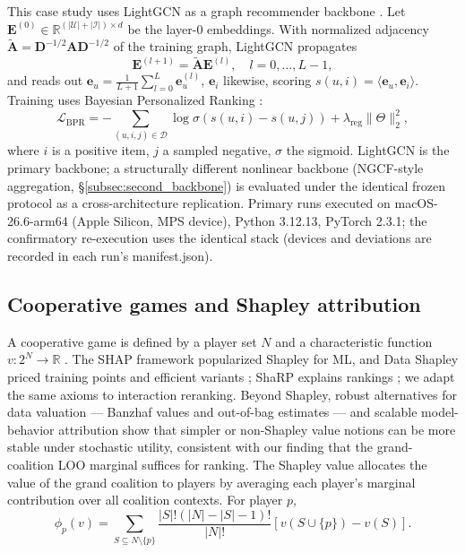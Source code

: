 \documentclass[pdflatex,sn-mathphys-num]{sn-jnl}
\begin{document}
This case study uses LightGCN as a graph recommender backbone \cite{he2020lightgcn}. Let $\mathbf{E}^{(0)}\in\mathbb{R}^{(|\mathcal{U}|+|\mathcal{I}|)\times d}$ be the layer-0 embeddings. With normalized adjacency $\tilde{\mathbf{A}}=\mathbf{D}^{-1/2}\mathbf{A}\mathbf{D}^{-1/2}$ of the training graph, LightGCN propagates
\begin{equation}
\mathbf{E}^{(l+1)} = \tilde{\mathbf{A}}\mathbf{E}^{(l)},\quad l=0,\dots,L-1,
\end{equation}
and reads out $\mathbf{e}_u = \frac{1}{L+1}\sum_{l=0}^{L} \mathbf{e}_u^{(l)}$, $\mathbf{e}_i$ likewise, scoring $s(u,i)=\langle \mathbf{e}_u,\mathbf{e}_i\rangle$. Training uses Bayesian Personalized Ranking \cite{rendle2009bpr}:
\begin{equation}
\mathcal{L}_{\text{BPR}} = -\sum_{(u,i,j)\in\mathcal{D}} \log\sigma(s(u,i)-s(u,j)) + \lambda_{\text{reg}}\|\Theta\|_2^2,
\end{equation}
where $i$ is a positive item, $j$ a sampled negative, $\sigma$ the sigmoid. LightGCN is the primary backbone; a structurally different nonlinear backbone (NGCF-style aggregation, \S\ref{subsec:second_backbone}) is evaluated under the identical frozen protocol as a cross-architecture replication. Primary runs executed on macOS-26.6-arm64 (Apple Silicon, MPS device), Python 3.12.13, PyTorch 2.3.1; the confirmatory re-execution uses the identical stack (devices and deviations are recorded in each run's manifest.json).

\subsection{Cooperative games and Shapley attribution}\label{subsec:shapley}

A cooperative game is defined by a player set $N$ and a characteristic function $v:2^N \rightarrow \mathbb{R}$ \cite{shapley1953value}. The SHAP framework \cite{lundberg2017shap} popularized Shapley for ML, and Data Shapley \cite{ghorbani2019datashapley} priced training points and efficient variants \cite{jia2019efficient}; ShaRP explains rankings \cite{pliatsika2025sharp}; we adapt the same axioms to interaction reranking. Beyond Shapley, robust alternatives for data valuation --- Banzhaf values \cite{wang2023banzhaf} and out-of-bag estimates \cite{kwon2023dataoob} --- and scalable model-behavior attribution \cite{park2023trak} show that simpler or non-Shapley value notions can be more stable under stochastic utility, consistent with our finding that the grand-coalition LOO marginal suffices for ranking. The Shapley value allocates the value of the grand coalition to players by averaging each player's marginal contribution over all coalition contexts. For player $p$,
\begin{equation}
\phi_p(v)=\sum_{S\subseteq N\setminus\{p\}} \frac{|S|!(|N|-|S|-1)!}{|N|!}\left[v(S\cup\{p\})-v(S)\right].
\end{equation}
\end{document}
